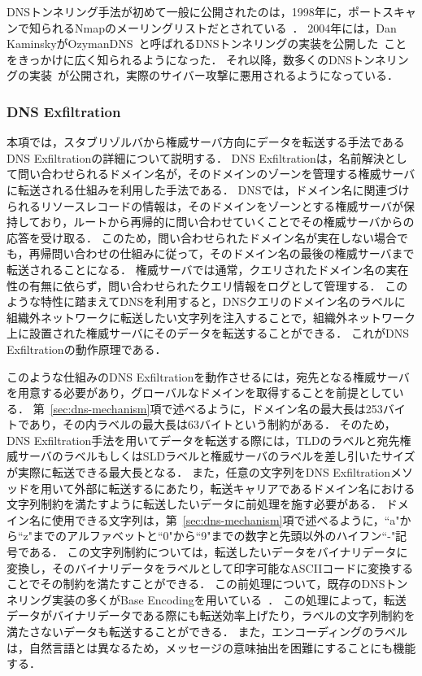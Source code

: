 DNSトンネリング手法が初めて一般に公開されたのは，1998年に，ポートスキャンで知られるNmapのメーリングリストだとされている~\cite{nmap, maarten}．
2004年には，Dan KaminskyがOzymanDNS~\cite{ozymandns}と呼ばれるDNSトンネリングの実装を公開した~\cite{dan-kaminsky}ことをきっかけに広く知られるようになった．
それ以降，数多くのDNSトンネリングの実装~\cite{heyoka, iodine, dnscat2, tcp-over-dns, dnscat, denise, dns-shell, dnsbotnet, dnscapy, dohtunnel, godoh, dohc2, magictunnelandroid, dns2tcp, tuns}が公開され，実際のサイバー攻撃に悪用されるようになっている．

\subsubsection{DNS Exfiltration}
\label{sec:dns-exfiltration}

本項では，スタブリゾルバから権威サーバ方向にデータを転送する手法であるDNS Exfiltrationの詳細について説明する．
DNS Exfiltrationは，名前解決として問い合わせられるドメイン名が，そのドメインのゾーンを管理する権威サーバに転送される仕組みを利用した手法である．
DNSでは，ドメイン名に関連づけられるリソースレコードの情報は，そのドメインをゾーンとする権威サーバが保持しており，ルートから再帰的に問い合わせていくことでその権威サーバからの応答を受け取る．
このため，問い合わせられたドメイン名が実在しない場合でも，再帰問い合わせの仕組みに従って，そのドメイン名の最後の権威サーバまで転送されることになる．
権威サーバでは通常，クエリされたドメイン名の実在性の有無に依らず，問い合わせられたクエリ情報をログとして管理する．
このような特性に踏まえてDNSを利用すると，DNSクエリのドメイン名のラベルに組織外ネットワークに転送したい文字列を注入することで，組織外ネットワーク上に設置された権威サーバにそのデータを転送することができる．
これがDNS Exfiltrationの動作原理である．

このような仕組みのDNS Exfiltrationを動作させるには，宛先となる権威サーバを用意する必要があり，グローバルなドメインを取得することを前提としている．
第~\ref{sec:dns-mechanism}項で述べるように，ドメイン名の最大長は253バイトであり，その内ラベルの最大長は63バイトという制約がある．
そのため，DNS Exfiltration手法を用いてデータを転送する際には，TLDのラベルと宛先権威サーバのラベルもしくはSLDラベルと権威サーバのラベルを差し引いたサイズが実際に転送できる最大長となる．
また，任意の文字列をDNS Exfiltrationメソッドを用いて外部に転送するにあたり，転送キャリアであるドメイン名における文字列制約を満たすように転送したいデータに前処理を施す必要がある．
ドメイン名に使用できる文字列は，第~\ref{sec:dns-mechanism}項で述べるように，``a"から``z"までのアルファベットと``0"から``9"までの数字と先頭以外のハイフン``-"記号である．
この文字列制約については，転送したいデータをバイナリデータに変換し，そのバイナリデータをラベルとして印字可能なASCIIコードに変換することでその制約を満たすことができる．
この前処理について，既存のDNSトンネリング実装の多くがBase Encodingを用いている~\cite{rfc4648}．
この処理によって，転送データがバイナリデータである際にも転送効率上げたり，ラベルの文字列制約を満たさないデータも転送することができる．
また，エンコーディングのラベルは，自然言語とは異なるため，メッセージの意味抽出を困難にすることにも機能する．

